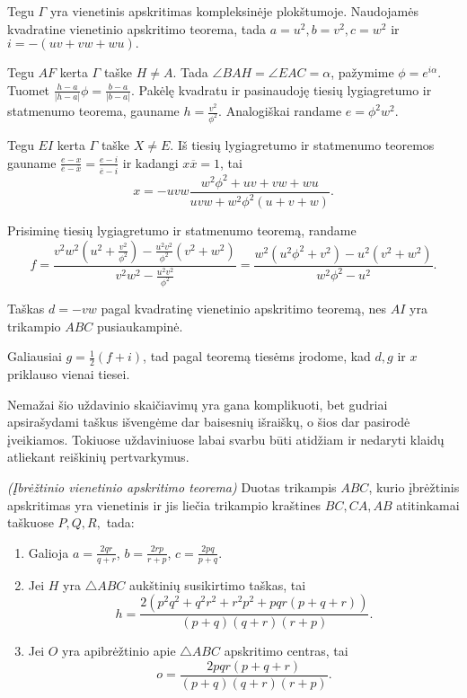 \documentclass[11pt,a4paper,twoside]{book}
\begin{document}
\begin{sprendimas}

Tegu $\Gamma$ yra vienetinis apskritimas kompleksinėje plokštumoje. Naudojamės kvadratine vienetinio apskritimo teorema, tada $a=u^2, b=v^2, c=w^2$ ir $i = -(uv+vw+wu).$

Tegu $AF$ kerta $\Gamma$ taške $H\ne A$. Tada $\angle BAH =\angle EAC =\alpha$, pažymime $\phi=e^{i\alpha}$. Tuomet $\frac{h-a}{|h-a|}\phi=\frac{b-a}{|b-a|}.$ Pakėlę kvadratu ir pasinaudoję tiesių lygiagretumo ir statmenumo teorema, gauname $h=\frac{v^2}{\phi^2}$. Analogiškai randame $e=\phi^2w^2$.

Tegu $EI$ kerta $\Gamma$ taške $X \ne E$. Iš tiesių lygiagretumo ir statmenumo teoremos gauname $\frac{e-x}{\overline{e}-\overline{x}}=\frac{e-i}{\overline{e}-\overline{i}}$ ir kadangi $x\overline{x}=1$, tai 
$$x=-uvw\frac{w^2\phi ^2 +uv+vw+wu}{uvw +w^2\phi ^2(u+v+w)}.$$

Prisiminę tiesių lygiagretumo ir statmenumo teoremą, randame 
$$f=\frac{v^2w^2(u^2 + \frac{v^2}{\phi ^2}) - \frac{u^2v^2}{\phi ^2}(v^2+w^2)}{v^2w^2 - \frac{u^2v^2}{\phi ^2}}=\frac{w^2(u^2\phi^2 + v^2) - u^2(v^2+w^2)}{w^2\phi^2 - u^2}.$$

Taškas $d=-vw$ pagal kvadratinę vienetinio apskritimo teoremą, nes $AI$ yra trikampio $ABC$ pusiaukampinė.

Galiausiai $g=\frac{1}{2}(f+i)$, tad pagal teoremą tiesėms įrodome, kad $d, g$ ir $x$ priklauso vienai tiesei.
\end{sprendimas}

Nemažai šio uždavinio skaičiavimų yra gana komplikuoti, bet gudriai apsirašydami taškus išvengėme dar baisesnių išraiškų, o šios dar pasirodė įveikiamos. Tokiuose uždaviniuose labai svarbu būti atidžiam ir nedaryti klaidų atliekant reiškinių pertvarkymus.













\begin{thmnr} \textit{(Įbrėžtinio vienetinio apskritimo teorema)} Duotas trikampis $ABC$, kurio įbrėžtinis apskritimas yra vienetinis ir jis liečia trikampio kraštines $BC, CA, AB$ atitinkamai taškuose $P, Q, R,$ tada:
\begin{enumerate}
\item Galioja $a=\frac{2qr}{q+r}$, $b=\frac{2rp}{r+p}$, $c=\frac{2pq}{p+q}$.
\item Jei $H$ yra $\bigtriangleup ABC$ aukštinių susikirtimo taškas, tai
$$h=\frac{2(p^2q^2 + q^2r^2 + r^2p^2 + pqr(p + q+ r))}{(p+q)(q+r)(r+p)}.$$
\item Jei $O$ yra apibrėžtinio apie  $\bigtriangleup ABC$ apskritimo centras, tai
$$o=\frac{2pqr(p+q+r)}{(p+q)(q+r)(r+p)}.$$
\end{enumerate}
\end{thmnr}
\end{document}
